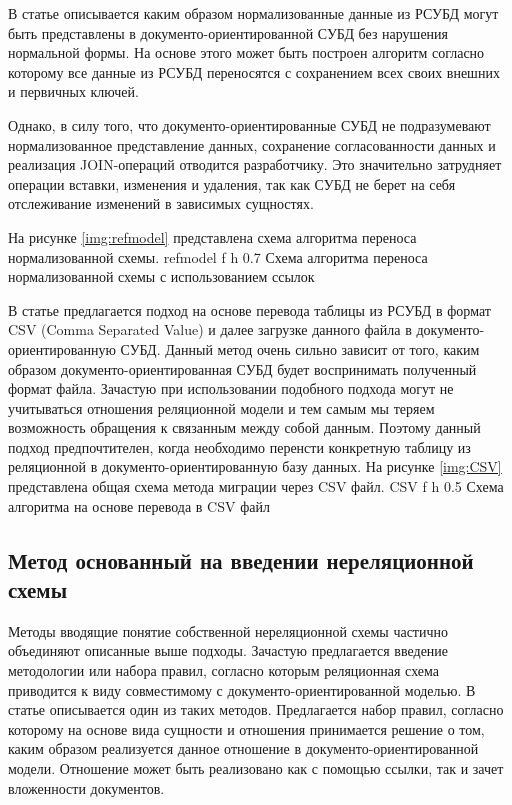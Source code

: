В статье \cite{reference} описывается каким образом нормализованные данные из РСУБД могут быть представлены в документо-ориентированной СУБД без нарушения нормальной формы.
На основе этого может быть построен алгоритм согласно которому все данные из РСУБД переносятся с сохранением всех своих внешних и первичных ключей.

Однако, в силу того, что документо-ориентированные СУБД не подразумевают нормализованное представление данных, сохранение согласованности данных и реализация JOIN-операций отводится разработчику.
Это значительно затрудняет операции вставки, изменения и удаления, так как СУБД не берет на себя отслеживание изменений в зависимых сущностях. 

\clearpage
На рисунке \ref{img:refmodel} представлена схема алгоритма переноса нормализованной схемы.
    {refmodel} %
    {f} %
    {h} %
    {0.7\textwidth} %
    {Схема алгоритма переноса нормализованной схемы с использованием ссылок} %

\clearpage
В статье \cite{csv} предлагается подход на основе перевода таблицы из РСУБД в формат CSV (Comma Separated Value) и далее загрузке данного файла в документо-ориентированную СУБД.
Данный метод очень сильно зависит от того, каким образом документо-ориентированная СУБД будет воспринимать полученный формат файла.
Зачастую при использовании подобного подхода могут не учитываться отношения реляционной модели и тем самым мы теряем возможность обращения к связанным между собой данным.
Поэтому данный подход предпочтителен, когда необходимо перенсти конкретную таблицу из реляционной в документо-ориентированную базу данных.
На рисунке \ref{img:CSV} представлена общая схема метода миграции через CSV файл.
    {CSV} %
    {f} %
    {h} %
    {0.5\textwidth} %
    {Схема алгоритма на основе перевода в CSV файл} %

\clearpage
\subsection{Метод основанный на введении нереляционной схемы}
Методы вводящие понятие собственной нереляционной схемы частично объединяют описанные выше подходы.
Зачастую предлагается введение методологии или набора правил,
согласно которым реляционная схема приводится к виду совместимому с документо-ориентированной моделью.
В статье \cite{DODS} описывается один из таких методов.
Предлагается набор правил, согласно которому на основе вида сущности и отношения принимается решение о том, каким образом реализуется данное отношение в документо-ориентированной модели.
Отношение может быть реализовано как с помощью ссылки, так и зачет вложенности документов.



